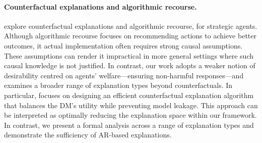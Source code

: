 \paragraph{Counterfactual explanations and algorithmic recourse.} 
\citet{tsirtsis2020decisions,karimi2022survey} explore counterfactual explanations and algorithmic recourse, for strategic agents. Although algorithmic recourse focuses on recommending actions to achieve better outcomes, it actual implementation often requires strong causal assumptions. These assumptions can render it impractical in more general settings where such causal knowledge is not justified.
In contrast, our work adopts a weaker notion of desirability centred on agents' welfare---ensuring non-harmful responses---and examines a broader range of explanation types beyond counterfactuals.
In particular, \citet{tsirtsis2020decisions} focuses on designing an efficient counterfactual explanation algorithm that balances the DM's utility while preventing model leakage. This approach can be interpreted as optimally reducing the explanation space within our framework. In contrast, we present a formal analysis across a range of explanation types and demonstrate the sufficiency of AR-based explanations.



